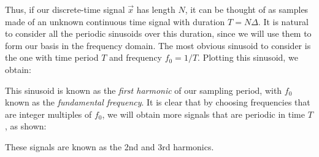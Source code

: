 \documentclass[letterpaper]{article}
\theoremstyle{remark}
\begin{document}
Thus, if our discrete-time signal $\vec{x}$ has length $N$, it can be thought of as samples made of an unknown continuous time signal with duration $T = N\Delta$. It is natural to consider all the periodic sinusoids over this duration, since we will use them to form our basis in the frequency domain. The most obvious sinusoid to consider is the one with time period $T$ and frequency $f_0 = 1 / T$. Plotting this sinusoid, we obtain:
\begin{center}
\end{center}
This sinusoid is known as the \emph{first harmonic} of our sampling period, with $f_0$ known as the \emph{fundamental frequency}. It is clear that by choosing frequencies that are integer multiples of $f_0$, we will obtain more signals that are periodic in time $T$, as shown:
\begin{center}
\end{center}
These signals are known as the 2nd and 3rd harmonics.
\end{document}
